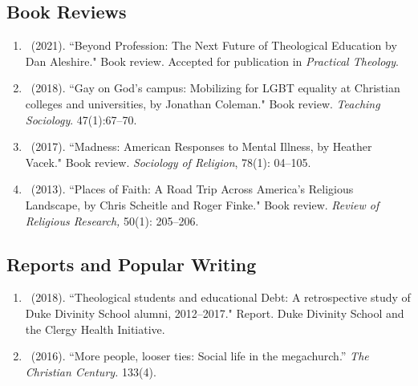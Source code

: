 \subsection*{Book Reviews}
\begin{enumerate} 
\item \Eagle\  (2021). ``Beyond Profession: The Next Future of Theological Education by Dan Aleshire." Book review. Accepted for publication in \emph{Practical Theology}.
	
\item \Eagle\  (2018). ``Gay on God’s campus: Mobilizing for LGBT equality at Christian colleges and universities, by Jonathan Coleman." Book review. \emph{Teaching Sociology}. 47(1):67--70. 

\item \Eagle\ (2017). ``Madness: American Responses to Mental Illness, by Heather Vacek." Book review. \emph{Sociology of Religion}, 78(1): 04--105. 

\item \Eagle\ (2013). ``Places of Faith: A Road Trip Across America's Religious Landscape, by Chris Scheitle and Roger Finke." Book review.  \emph{Review of Religious Research,} 50(1): 205--206.
\end{enumerate}

\subsection*{Reports and Popular Writing}
\begin{enumerate} 
\item \Eagle\ (2018). ``Theological students and educational Debt: A retrospective study of Duke Divinity School alumni, 2012--2017." Report. Duke Divinity School and the Clergy Health Initiative.

\item \Eagle\ (2016). ``More people, looser ties: Social life in the megachurch.'' \emph{The Christian Century.} 133(4).
\end{enumerate}